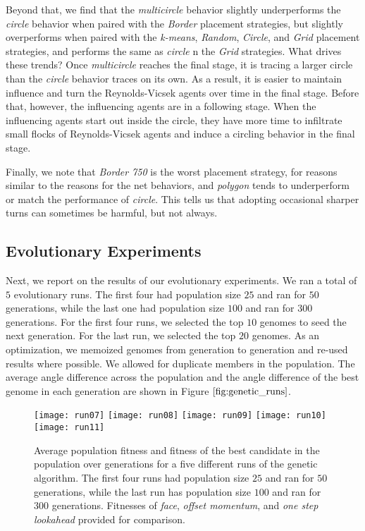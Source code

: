 Beyond that, we find that the \textit{multicircle} behavior slightly
underperforms the \textit{circle} behavior when paired with the
\textit{Border} placement strategies, but slightly overperforms when paired
with the  \textit{k-means}, \textit{Random}, \textit{Circle}, and
\textit{Grid} placement strategies, and performs the same as \textit{circle}
n the \textit{Grid} strategies.
What drives these trends?
Once \textit{multicircle} reaches the final stage, it is tracing a larger
circle than the \textit{circle} behavior traces on its own.
As a result, it is easier to maintain influence and turn the Reynolds-Vicsek agents
over time in the final stage.
Before that, however, the influencing agents are in a following stage.
When the influencing agents start out inside the circle, they have more time to
infiltrate small flocks of Reynolds-Vicsek agents and induce a circling behavior in
the final stage.

Finally, we note that \textit{Border 750} is the worst placement strategy,
for reasons similar to the reasons for the net behaviors, and \textit{polygon}
tends to underperform or match the performance of \textit{circle}.
This tells us that adopting occasional sharper turns can sometimes be harmful,
but not always.

\subsection{Evolutionary Experiments}
Next, we report on the results of our evolutionary experiments.
We ran a total of $5$ evolutionary runs.
The first four had population size $25$ and ran for $50$ generations, while the
last one had population size $100$ and ran for $300$ generations.
For the first four runs, we selected the top $10$ genomes to seed the next
generation.
For the last run, we selected the top $20$ genomes.
As an optimization, we memoized genomes from generation to generation and re-used
results where possible.
We allowed for duplicate members in the population.
The average angle difference across the population and the angle difference of the
best genome in each generation are shown in Figure $\ref{fig:genetic_runs}$.
\begin{figure}
    \centering
    \texttt{[image: run07]}
    \texttt{[image: run08]}
    \texttt{[image: run09]}
    \texttt{[image: run10]}
    \texttt{[image: run11]}
    \caption{Average population fitness and fitness of the best candidate in the
    population over generations for a five different runs of the genetic algorithm.
    The first four runs had population size $25$ and ran for $50$ generations,
    while the last run has population size $100$ and ran for $300$ generations.
    Fitnesses of \textit{face}, \textit{offset momentum}, and \textit{one step
    lookahead} provided for comparison.}
    \label{fig:genetic_runs}
\end{figure}

